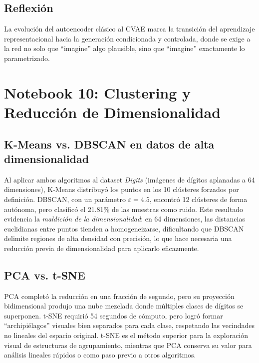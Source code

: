 \documentclass[12pt, a4paper]{article}
\begin{document}
\subsection{Reflexión}

La evolución del autoencoder clásico al CVAE marca la transición del aprendizaje representacional hacia la generación condicionada y controlada, donde se exige a la red no solo que ``imagine'' algo plausible, sino que ``imagine'' exactamente lo parametrizado.

\section{Notebook 10: Clustering y Reducción de Dimensionalidad}

\subsection{K-Means vs. DBSCAN en datos de alta dimensionalidad}

Al aplicar ambos algoritmos al dataset \textit{Digits} (imágenes de dígitos aplanadas a 64 dimensiones), K-Means distribuyó los puntos en los 10 clústeres forzados por definición. DBSCAN, con un parámetro $\varepsilon = 4.5$, encontró 12 clústeres de forma autónoma, pero clasificó el 21.81\% de las muestras como ruido. Este resultado evidencia la \textit{maldición de la dimensionalidad}: en 64 dimensiones, las distancias euclidianas entre puntos tienden a homogeneizarse, dificultando que DBSCAN delimite regiones de alta densidad con precisión, lo que hace necesaria una reducción previa de dimensionalidad para aplicarlo eficazmente.

\subsection{PCA vs. t-SNE}

PCA completó la reducción en una fracción de segundo, pero su proyección bidimensional produjo una nube mezclada donde múltiples clases de dígitos se superponen. t-SNE requirió 54 segundos de cómputo, pero logró formar ``archipiélagos'' visuales bien separados para cada clase, respetando las vecindades no lineales del espacio original. t-SNE es el método superior para la exploración visual de estructuras de agrupamiento, mientras que PCA conserva su valor para análisis lineales rápidos o como paso previo a otros algoritmos.
\end{document}
